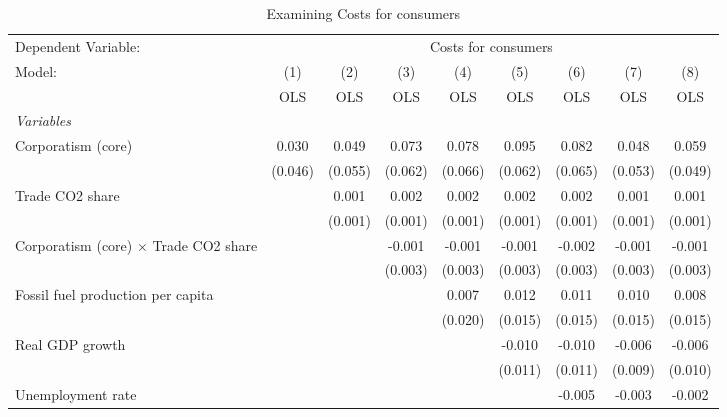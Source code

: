 
\begin{table}[htbp]
   \caption{Examining Costs for consumers}
   \centering
   \begin{tabular}{lcccccccc}
      \toprule
      Dependent Variable: & \multicolumn{8}{c}{Costs for consumers}\\
      Model:                                       & (1)     & (2)     & (3)     & (4)     & (5)     & (6)     & (7)     & (8)\\  
                                                   &  OLS    & OLS     & OLS     & OLS     & OLS     & OLS     & OLS     & OLS\\  
      \midrule
      \emph{Variables}\\
      Corporatism (core)                           & 0.030   & 0.049   & 0.073   & 0.078   & 0.095   & 0.082   & 0.048   & 0.059\\   
                                                   & (0.046) & (0.055) & (0.062) & (0.066) & (0.062) & (0.065) & (0.053) & (0.049)\\   
      Trade CO2 share                              &         & 0.001   & 0.002   & 0.002   & 0.002   & 0.002   & 0.001   & 0.001\\   
                                                   &         & (0.001) & (0.001) & (0.001) & (0.001) & (0.001) & (0.001) & (0.001)\\   
      Corporatism (core) $\times$ Trade CO2 share  &         &         & -0.001  & -0.001  & -0.001  & -0.002  & -0.001  & -0.001\\   
                                                   &         &         & (0.003) & (0.003) & (0.003) & (0.003) & (0.003) & (0.003)\\   
      Fossil fuel production per capita            &         &         &         & 0.007   & 0.012   & 0.011   & 0.010   & 0.008\\   
                                                   &         &         &         & (0.020) & (0.015) & (0.015) & (0.015) & (0.015)\\   
      Real GDP growth                              &         &         &         &         & -0.010  & -0.010  & -0.006  & -0.006\\   
                                                   &         &         &         &         & (0.011) & (0.011) & (0.009) & (0.010)\\   
      Unemployment rate                            &         &         &         &         &         & -0.005  & -0.003  & -0.002\\   

\end{tabular}
\end{table}
